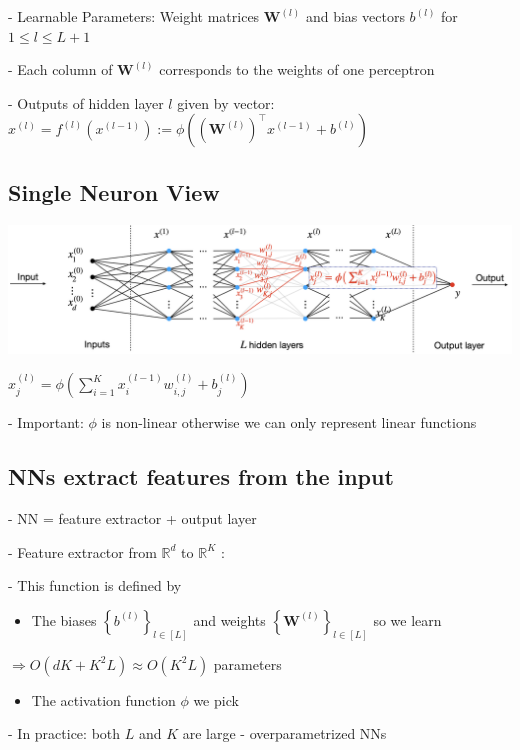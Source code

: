 - Learnable Parameters: Weight matrices $\mathbf{W}^{(l)}$ and bias vectors $b^{(l)}$ for $1 \leq l \leq L+1$ 

- Each column of $\mathbf{W}^{(l)}$ corresponds to the weights of one perceptron

- Outputs of hidden layer $l$ given by vector: $x^{(l)}=f^{(l)}\left(x^{(l-1)}\right):=\phi\left(\left(\mathbf{W}^{(l)}\right)^{\top} x^{(l-1)}+b^{(l)}\right)$

\subsection*{Single Neuron View}
\includegraphics*[width=\columnwidth]{figures/nn2.png}

$
x_{j}^{(l)}=\phi\left(\sum_{i=1}^{K} x_{i}^{(l-1)} w_{i, j}^{(l)}+b_{j}^{(l)}\right)
$

- Important: $\phi$ is non-linear otherwise we can only represent linear functions

\subsection*{NNs extract features from the input}
- NN = feature extractor + output layer

- Feature extractor from $\mathbb{R}^{d}$ to $\mathbb{R}^{K}$ :

- This function is defined by

\begin{itemize}
  \item The biases $\left\{b^{(l)}\right\}_{l \in[L]}$ and weights $\left\{\mathbf{W}^{(l)}\right\}_{l \in[L]}$ so we learn
\end{itemize}

$\Rightarrow O\left(d K+K^{2} L\right) \approx O\left(K^{2} L\right)$ parameters

\begin{itemize}
  \item The activation function $\phi$ we pick
\end{itemize}

- In practice: both $L$ and $K$ are large - overparametrized NNs

